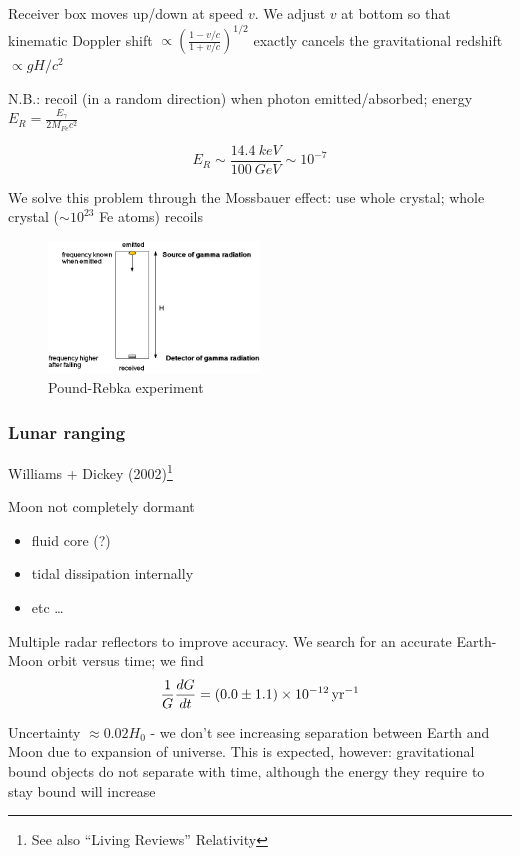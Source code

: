 \documentclass[a4paper]{article} %
\begin{document}
Receiver box moves up/down at speed $v$. We adjust $v$ at bottom so that kinematic Doppler shift $\propto \left(\frac{1-v/c}{1+v/c}\right)^{1/2}$ exactly cancels the gravitational redshift $\propto gH/c^2$

N.B.: recoil (in a random direction) when photon emitted/absorbed; energy $E_R=\frac{E_\gamma}{2M_{Fe}c^2}$

\begin{equation}
E_R\sim\frac{\SI{14.4}{keV}}{\SI{100}{GeV}}\sim 10^{-7}
\end{equation}

We solve this problem through the Mossbauer effect: use whole crystal; whole crystal ($\sim10^{23}$ Fe atoms) recoils

\begin{figure}[h]
\centering
\includegraphics[width=0.5\textwidth]{images/pound-rebka.png}
\caption{Pound-Rebka experiment}
\end{figure}


\subsubsection{Lunar ranging}
Williams + Dickey (2002)\footnote{See also ``Living Reviews'' Relativity}

Moon not completely dormant
\begin{itemize}
\item fluid core (?)
\item tidal dissipation internally
\item etc \ldots
\end{itemize}

Multiple radar reflectors to improve accuracy. We search for an accurate Earth-Moon orbit versus time; we find
\begin{equation}
\frac{1}{G}\frac{dG}{dt}=(0.0\pm 1.1)\times \SI{d-12}{yr^{-1}}
\end{equation}

Uncertainty $\approx 0.02 H_0$ - we don't see increasing separation between Earth and Moon due to expansion of universe. This is expected, however: gravitational bound objects do not separate with time, although the energy they require to stay bound will increase
\end{document}
